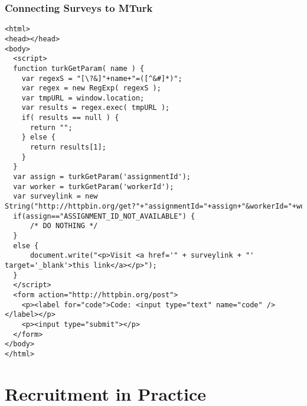 \begin{frame}[fragile]
\frametitle{Connecting Surveys to MTurk}

\tiny
\begin{verbatim}
<html>
<head></head>
<body>
  <script>
  function turkGetParam( name ) { 
    var regexS = "[\?&]"+name+"=([^&#]*)"; 
    var regex = new RegExp( regexS ); 
    var tmpURL = window.location; 
    var results = regex.exec( tmpURL ); 
    if( results == null ) { 
      return ""; 
    } else { 
      return results[1];    
    } 
  }
  var assign = turkGetParam('assignmentId');
  var worker = turkGetParam('workerId');
  var surveylink = new String("http://httpbin.org/get?"+"assignmentId="+assign+"&workerId="+worker);
  if(assign=="ASSIGNMENT_ID_NOT_AVAILABLE") {
      /* DO NOTHING */
  }
  else {
      document.write("<p>Visit <a href='" + surveylink + "' target='_blank'>this link</a></p>");
  }
  </script>
  <form action="http://httpbin.org/post">
    <p><label for="code">Code: <input type="text" name="code" /></label></p>
    <p><input type="submit"></p>
  </form>
</body>
</html>
\end{verbatim}
\end{frame}


















\section[Recruitment]{Recruitment in Practice}
\frame{\tableofcontents[currentsection]}




